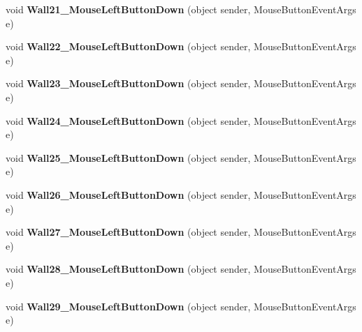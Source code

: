 \begin{DoxyCompactItemize}
void {\bfseries Wall21\+\_\+\+Mouse\+Left\+Button\+Down} (object sender, Mouse\+Button\+Event\+Args e)
\item 
\mbox{\label{class_r6_1_1_border_window_a70b13a417e899d2c9c293260c1203da0}} 
void {\bfseries Wall22\+\_\+\+Mouse\+Left\+Button\+Down} (object sender, Mouse\+Button\+Event\+Args e)
\item 
\mbox{\label{class_r6_1_1_border_window_a4269204dea868f59c0b10412949aa6ca}} 
void {\bfseries Wall23\+\_\+\+Mouse\+Left\+Button\+Down} (object sender, Mouse\+Button\+Event\+Args e)
\item 
\mbox{\label{class_r6_1_1_border_window_abfc384a45b5d2c5e2760fd3dee7ca958}} 
void {\bfseries Wall24\+\_\+\+Mouse\+Left\+Button\+Down} (object sender, Mouse\+Button\+Event\+Args e)
\item 
\mbox{\label{class_r6_1_1_border_window_ae9e52a1ea8c9c73cde18fa8bdd54b1d1}} 
void {\bfseries Wall25\+\_\+\+Mouse\+Left\+Button\+Down} (object sender, Mouse\+Button\+Event\+Args e)
\item 
\mbox{\label{class_r6_1_1_border_window_a9de4502b5e12fb078673df3354080132}} 
void {\bfseries Wall26\+\_\+\+Mouse\+Left\+Button\+Down} (object sender, Mouse\+Button\+Event\+Args e)
\item 
\mbox{\label{class_r6_1_1_border_window_ae2d6039e4c0b63acc4de88b29d19818f}} 
void {\bfseries Wall27\+\_\+\+Mouse\+Left\+Button\+Down} (object sender, Mouse\+Button\+Event\+Args e)
\item 
\mbox{\label{class_r6_1_1_border_window_a166b99481545f1e6e4b5cffb8d036928}} 
void {\bfseries Wall28\+\_\+\+Mouse\+Left\+Button\+Down} (object sender, Mouse\+Button\+Event\+Args e)
\item 
\mbox{\label{class_r6_1_1_border_window_a1b603231385de8b493a797f474a0b4f3}} 
void {\bfseries Wall29\+\_\+\+Mouse\+Left\+Button\+Down} (object sender, Mouse\+Button\+Event\+Args e)
\item 
\mbox{\label{class_r6_1_1_border_window_a82278ad382b26c4dbf607b83939f0b91}} 

\end{DoxyCompactItemize}
